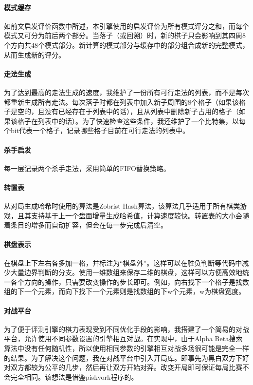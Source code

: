 \documentclass{ctexart}
\begin{document}
\paragraph{模式缓存} 如前文启发评价函数中所述，本引擎使用的启发评价为所有模式评分之和，而每个模式又可分为前后两个部分。当落子（或回溯）时，新的棋子只会影响到其四周8个方向共48个模式部分。新计算的模式部分与缓存中的部分组合成新的完整模式，从而生成新的评分。

\paragraph{走法生成} 为了达到最高的走法生成的速度，我维护了一份所有可行走法的列表，而不是每次都重新生成所有走法。每次落子时都在列表中加入新子周围的8个格子（如果该格子是空的，且没有已经存在于列表中的话），且从列表中删除新子占用的格子（如果该格子在列表中的话）。为了快速检查这些条件，我还维护了一个比特集，以每个bit代表一个格子，记录哪些格子目前在可行走法的列表中。

\paragraph{杀手启发} 每一层记录两个杀手走法，采用简单的FIFO替换策略。

\paragraph{转置表} 从对局生成哈希时使用的算法是Zobrist Hash算法，该算法几乎适用于所有棋类游戏，且其支持基于上一个盘面增量生成哈希值，计算速度较快。转置表的大小会随着条目的增多而自动扩容，但会在每一步完成后清空。

\paragraph{棋盘表示} 在棋盘上下左右各多加一格，并标注为“棋盘外”。这样可以在胜负判断等代码中减少大量边界判断的分支。使用一维数组来保存二维的棋盘，这样可以方便高效地统一各个方向的操作，只需要改变操作的步长即可。例如，向右找下一个格子是找数组的下一个元素，而向下找下一个元素则是找数组的下w个元素，w为棋盘宽度。

\paragraph{对战平台} 为了便于评测引擎的棋力表现受到不同优化手段的影响，我搭建了一个简易的对战平台，允许使用不同参数设置的引擎相互对战。在实现中，由于Alpha Beta搜索算法中没有任何随机性，所以使用相同参数的引擎相互对战多场很可能是完全一样的结果。为了解决这个问题，我在对战平台中引入开局库。即事先为黑白双方下好对双方都较为公平的几步，然后再让双方开始对弈。改变开局即可保证每局比赛不会完全相同。该想法是借鉴piskvork程序的。
\end{document}
